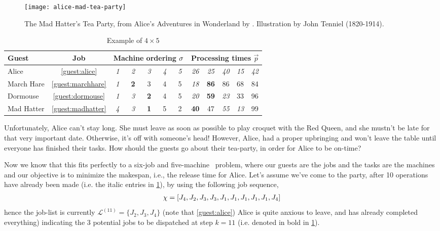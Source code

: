 \begin{figure}[b!]
    \texttt{[image: alice-mad-tea-party]}
    \caption{The Mad Hatter's Tea Party, from Alice's Adventures in Wonderland 
        by \citet{alice}. Illustration by John Tenniel 
        (1820-1914).}\label{fig:teaparty}
\end{figure}

\begin{table}[h]\centering
\caption{Example of $4\times5$ \JSP}\label{tbl:example}
\begin{tabular}{lc|ccccc|ccccc} \toprule
Guest & \multicolumn{1}{c}{Job} & \multicolumn{5}{c}{Machine ordering 
${\mathbf{\sigma}}$} & \multicolumn{5}{c}{Processing times $\vec{p}$} \\ \midrule
Alice & \ref{guest:alice} & \textit{1} & \textit{2} & \textit{3} & \textit{4} & 
\textit{5} & 
\textit{26} & \textit{25} & \textit{40} & \textit{15} & \textit{42} \\
March Hare & \ref{guest:marchhare} & \textit{1} & \textbf{2} & 3 & 4 & 5 & 
\textit{18} & \textbf{86} & 86 & 68 & 84 \\
Dormouse & \ref{guest:dormouse} & \textit{1} & \textit{3} & \textbf{2} & 4 & 5 
& 
\textit{20} & \textbf{59} & \textit{23} & 33 & 96 \\
Mad Hatter & \ref{guest:madhatter} & \textit{4} & \textit{3} & \textbf{1} & 5 & 
2 & \textbf{40} & 47 & \textit{55} & \textit{13} & 99 
\\
\bottomrule
\end{tabular}
\end{table}

Unfortunately, Alice can't stay long. She must leave as soon as possible to 
play croquet with the Red Queen, 
and she mustn't be late for that very important date. Otherwise, it's off with 
someone's head! However, Alice, had a proper upbringing and won't leave the 
table until everyone has finished their tasks. 
How should the guests go about their tea-party, in order for Alice to be 
on-time?

Now we know that this fits perfectly to a six-job and five-machine \jsp\ 
problem, where our guests are the jobs and the tasks are the machines and our 
objective is to minimize the makespan, i.e., the release time for Alice. 
Let's assume we've come to the party, after 10 operations have already been 
made (i.e. the italic entries in \cref{tbl:example}), by using the following 
job sequence,
\begin{eqnarray}
	{\mathbf{\chi}}=\left[ J_4,J_2,J_3,J_3,J_1,J_1,J_1,J_1,J_1,J_4 \right]
\end{eqnarray}
hence the job-list is currently $\mathcal{L}^{(11)}=\{J_2,J_3,J_4\}$ (note that 
\ref{guest:alice}) Alice is quite anxious to leave, and has already completed 
everything) indicating the 3 potential jobs to be dispatched at step $k=11$ 
(i.e. denoted in bold in \cref{tbl:example}).
 
